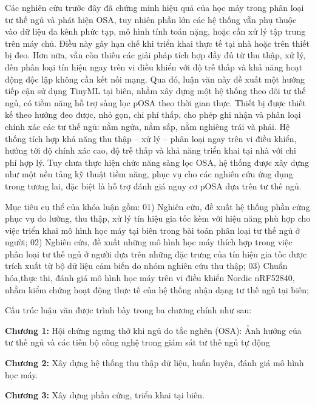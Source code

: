 Các nghiên cứu trước đây đã chứng minh hiệu quả của học máy trong phân loại tư
thế ngủ và phát hiện OSA, tuy nhiên phần lớn các hệ thống vẫn phụ thuộc vào dữ
liệu đa kênh phức tạp, mô hình tính toán nặng, hoặc cần xử lý tập trung trên
máy chủ. Điều này gây hạn chế khi triển khai thực tế tại nhà hoặc trên thiết bị
đeo. Hơn nữa, vẫn còn thiếu các giải pháp tích hợp đầy đủ từ thu thập, xử lý,
đến phân loại tín hiệu ngay trên vi điều khiển với độ trễ thấp và khả năng hoạt
động độc lập không cần kết nối mạng. Qua đó, luận văn này đề xuất một hướng
tiếp cận sử dụng TinyML tại biên, nhằm xây dựng một hệ thống theo dõi tư thế
ngủ, có tiềm năng hỗ trợ sàng lọc pOSA theo thời gian thực. Thiết bị được thiết
kế theo hướng đeo được, nhỏ gọn, chi phí thấp, cho phép ghi nhận và phân loại
chính xác các tư thế ngủ: nằm ngửa, nằm sấp, nằm nghiêng trái và phải. Hệ thống
tích hợp khả năng thu thập – xử lý – phân loại ngay trên vi điều khiển, hướng
tới độ chính xác cao, độ trễ thấp và khả năng triển khai tại nhà với chi phí
hợp lý. Tuy chưa thực hiện chức năng sàng lọc OSA, hệ thống được xây dựng như
một nền tảng kỹ thuật tiềm năng, phục vụ cho các nghiên cứu ứng dụng trong
tương lai, đặc biệt là hỗ trợ đánh giá nguy cơ pOSA dựa trên tư thế ngủ.

Mục tiêu cụ thể của khóa luận gồm: 01) Nghiên cứu, đề xuất hệ thống phần cứng
phục vụ đo lường, thu thập, xử lý tín hiệu gia tốc kèm với hiệu năng phù hợp
cho việc triển khai mô hình học máy tại biên trong bài toán phân loại tư thế
ngủ ở người; 02) Nghiên cứu, đề xuất những mô hình học máy thích hợp trong việc
phân loại tư thế ngủ ở người dựa trên những đặc trưng của tín hiệu gia tốc được
trích xuất từ bộ dữ liệu cảm biến do nhóm nghiên cứu thu thập; 03) Chuẩn
hóa,thực thi, đánh giá mô hình học máy trên vi điều khiển Nordic nRF52840, nhằm
kiểm chứng hoạt động thực tế của hệ thống nhận dạng tư thế ngủ tại biên;

Cấu trúc luận văn được trình bày trong ba chương chính như sau:

\noindent\textbf{Chương 1:} Hội chứng ngưng thở khi ngủ do tắc nghẽn (OSA): Ảnh hưởng của tư thế ngủ và các tiến bộ công nghệ trong giám sát tư thế ngủ tự động

\noindent\textbf{Chương 2:} Xây dựng hệ thống thu thập dữ liệu, huấn luyện,
đánh giá
mô hình học máy.

\noindent\textbf{Chương 3:} Xây dựng phần cứng, triển khai tại biên.
